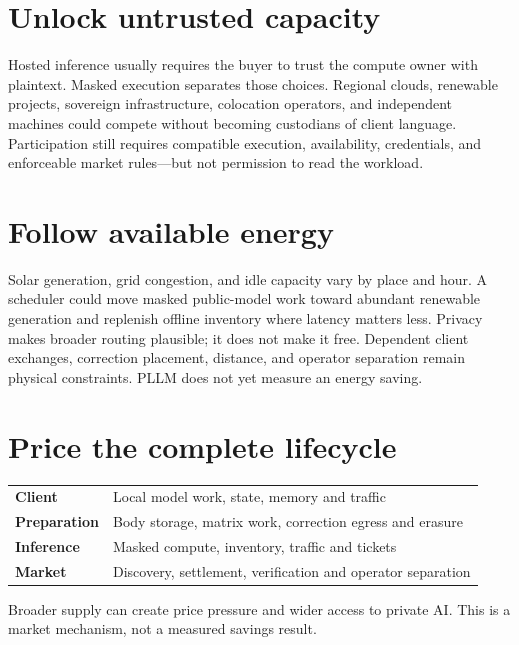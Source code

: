 \documentclass[10pt,letterpaper]{article}
\begin{document}
\vspace{2pt}
\begin{minipage}[t]{.485\textwidth}\vspace{0pt}
\section*{Unlock untrusted capacity}
Hosted inference usually requires the buyer to trust the compute owner with plaintext. Masked execution separates those choices. Regional clouds, renewable projects, sovereign infrastructure, colocation operators, and independent machines could compete without becoming custodians of client language. Participation still requires compatible execution, availability, credentials, and enforceable market rules---but not permission to read the workload.

\section*{Follow available energy}
Solar generation, grid congestion, and idle capacity vary by place and hour. A scheduler could move masked public-model work toward abundant renewable generation and replenish offline inventory where latency matters less. Privacy makes broader routing plausible; it does not make it free. Dependent client exchanges, correction placement, distance, and operator separation remain physical constraints. PLLM does not yet measure an energy saving.

\section*{Price the complete lifecycle}
{\fontsize{7.2}{8.4}\selectfont{}
\begin{tabularx}{\linewidth}{@{}>{\bfseries}p{1.55cm}X@{}}
\toprule
Client & Local model work, state, memory and traffic \\
Preparation & Body storage, matrix work, correction egress and erasure \\
Inference & Masked compute, inventory, traffic and tickets \\
Market & Discovery, settlement, verification and operator separation \\
\bottomrule
\end{tabularx}}
Broader supply can create price pressure and wider access to private AI. This is a market mechanism, not a measured savings result.
\end{minipage}\hfill
\end{document}
